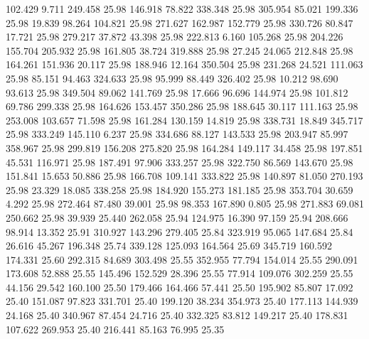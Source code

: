  102.429    9.711  249.458        25.98
 146.918   78.822  338.348        25.98
 305.954   85.021  199.336        25.98
  19.839   98.264  104.821        25.98
 271.627  162.987  152.779        25.98
 330.726   80.847   17.721        25.98
 279.217   37.872   43.398        25.98
 222.813    6.160  105.268        25.98
 204.226  155.704  205.932        25.98
 161.805   38.724  319.888        25.98
  27.245   24.065  212.848        25.98
 164.261  151.936   20.117        25.98
 188.946   12.164  350.504        25.98
 231.268   24.521  111.063        25.98
  85.151   94.463  324.633        25.98
  95.999   88.449  326.402        25.98
  10.212   98.690   93.613        25.98
 349.504   89.062  141.769        25.98
  17.666   96.696  144.974        25.98
 101.812   69.786  299.338        25.98
 164.626  153.457  350.286        25.98
 188.645   30.117  111.163        25.98
 253.008  103.657   71.598        25.98
 161.284  130.159   14.819        25.98
 338.731   18.849  345.717        25.98
 333.249  145.110    6.237        25.98
 334.686   88.127  143.533        25.98
 203.947   85.997  358.967        25.98
 299.819  156.208  275.820        25.98
 164.284  149.117   34.458        25.98
 197.851   45.531  116.971        25.98
 187.491   97.906  333.257        25.98
 322.750   86.569  143.670        25.98
 151.841   15.653   50.886        25.98
 166.708  109.141  333.822        25.98
 140.897   81.050  270.193        25.98
  23.329   18.085  338.258        25.98
 184.920  155.273  181.185        25.98
 353.704   30.659    4.292        25.98
 272.464   87.480   39.001        25.98
  98.353  167.890    0.805        25.98
 271.883   69.081  250.662        25.98
  39.939   25.440  262.058        25.94
 124.975   16.390   97.159        25.94
 208.666   98.914   13.352        25.91
 310.927  143.296  279.405        25.84
 323.919   95.065  147.684        25.84
  26.616   45.267  196.348        25.74
 339.128  125.093  164.564        25.69
 345.719  160.592  174.331        25.60
 292.315   84.689  303.498        25.55
 352.955   77.794  154.014        25.55
 290.091  173.608   52.888        25.55
 145.496  152.529   28.396        25.55
  77.914  109.076  302.259        25.55
  44.156   29.542  160.100        25.50
 179.466  164.466   57.441        25.50
 195.902   85.807   17.092        25.40
 151.087   97.823  331.701        25.40
 199.120   38.234  354.973        25.40
 177.113  144.939   24.168        25.40
 340.967   87.454   24.716        25.40
 332.325   83.812  149.217        25.40
 178.831  107.622  269.953        25.40
 216.441   85.163   76.995        25.35
